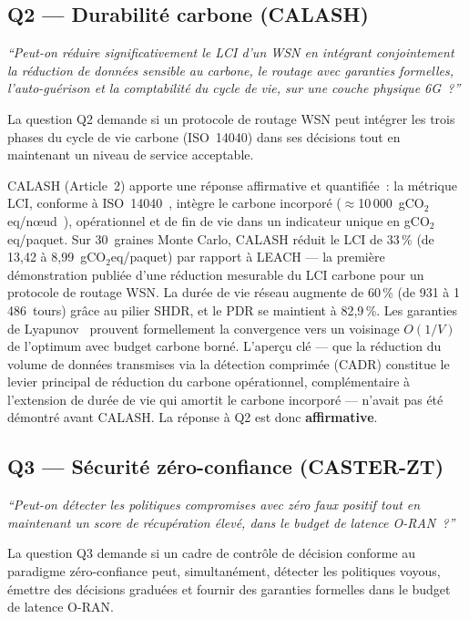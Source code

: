 \subsection{Q2 --- Durabilité carbone (CALASH)}

\noindent\textit{``Peut-on réduire significativement le LCI d'un WSN en intégrant conjointement la réduction de données sensible au carbone, le routage avec garanties formelles, l'auto-guérison et la comptabilité du cycle de vie, sur une couche physique 6G~?''}

\medskip
La question Q2 demande si un protocole de routage WSN peut intégrer les trois phases du cycle de vie carbone (ISO~14040) dans ses décisions tout en maintenant un niveau de service acceptable.

CALASH (Article~2) apporte une réponse affirmative et quantifiée~: la métrique LCI, conforme à ISO~14040~\cite{iso14040}, intègre le carbone incorporé ($\approx$10\,000~gCO$_2$eq/nœud~\cite{pirson2021embodied}), opérationnel et de fin de vie dans un indicateur unique en gCO$_2$eq/paquet. Sur 30~graines Monte Carlo, CALASH réduit le LCI de 33\,\% (de 13{,}42 à 8{,}99~gCO$_2$eq/paquet) par rapport à LEACH --- la première démonstration publiée d'une réduction mesurable du LCI carbone pour un protocole de routage WSN. La durée de vie réseau augmente de 60\,\% (de 931 à 1\,486~tours) grâce au pilier SHDR, et le PDR se maintient à 82{,}9\,\%. Les garanties de Lyapunov~\cite{neely2010lyapunov} prouvent formellement la convergence vers un voisinage $O(1/V)$ de l'optimum avec budget carbone borné. L'aperçu clé --- que la réduction du volume de données transmises via la détection comprimée (CADR) constitue le levier principal de réduction du carbone opérationnel, complémentaire à l'extension de durée de vie qui amortit le carbone incorporé --- n'avait pas été démontré avant CALASH. La réponse à Q2 est donc \textbf{affirmative}.

\subsection{Q3 --- Sécurité zéro-confiance (CASTER-ZT)}

\noindent\textit{``Peut-on détecter les politiques compromises avec zéro faux positif tout en maintenant un score de récupération élevé, dans le budget de latence O-RAN~?''}

\medskip
La question Q3 demande si un cadre de contrôle de décision conforme au paradigme zéro-confiance peut, simultanément, détecter les politiques voyous, émettre des décisions graduées et fournir des garanties formelles dans le budget de latence O-RAN.

